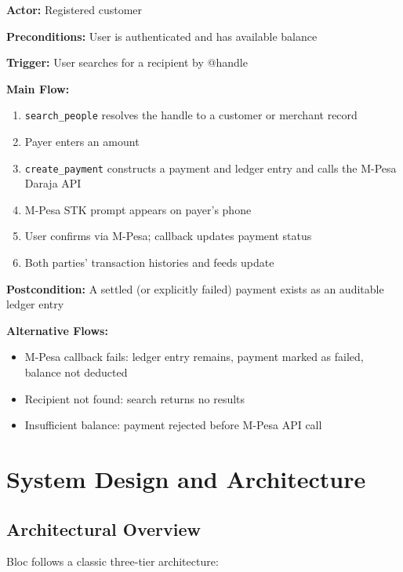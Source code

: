 \documentclass[12pt, a4paper, twoside, openright]{report}
\begin{document}
\textbf{Actor:} Registered customer

\textbf{Preconditions:} User is authenticated and has available balance

\textbf{Trigger:} User searches for a recipient by @handle

\textbf{Main Flow:}
\begin{enumerate}
    \item \texttt{search\_people} resolves the handle to a customer or merchant record
    \item Payer enters an amount
    \item \texttt{create\_payment} constructs a payment and ledger entry and calls the M-Pesa Daraja API
    \item M-Pesa STK prompt appears on payer's phone
    \item User confirms via M-Pesa; callback updates payment status
    \item Both parties' transaction histories and feeds update
\end{enumerate}

\textbf{Postcondition:} A settled (or explicitly failed) payment exists as an auditable ledger entry

\textbf{Alternative Flows:}
\begin{itemize}
    \item M-Pesa callback fails: ledger entry remains, payment marked as failed, balance not deducted
    \item Recipient not found: search returns no results
    \item Insufficient balance: payment rejected before M-Pesa API call
\end{itemize}


\chapter{System Design and Architecture}

\section{Architectural Overview}

Bloc follows a classic three-tier architecture:
\end{document}
